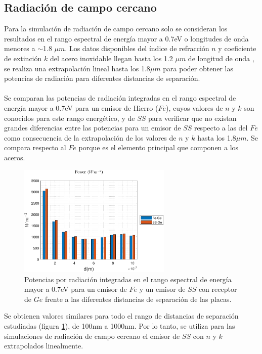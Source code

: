 \subsection{Radiación de campo cercano}
Para la simulación de radiación de campo cercano solo se consideran los resultados en el rango espectral de energía mayor a 0.7eV o longitudes de onda menores a $\sim$1.8 $\mu m$. Los datos disponibles del índice de refracción $n$ y coeficiente de extinción $k$ del acero inoxidable llegan hasta los 1.2 $\mu m$ de longitud de onda \cite{ss_optical_2017}, se realiza una extrapolación lineal hasta los 1.8$\mu m$ para poder obtener las potencias de radiación para diferentes distancias de separación.\\\\
Se comparan las potencias de radiación integradas en el rango espectral de energía mayor a 0.7eV para un emisor de Hierro ($Fe$), cuyos valores de $n$ y $k$ son conocidos para este rango energético, y de $SS$ para verificar que no existan grandes diferencias entre las potencias para un emisor de $SS$ respecto a las del $Fe$ como consecuencia de la extrapolación de los valores de $n$ y $k$ hasta los 1.8$\mu m$. Se compara respecto al $Fe$ porque es el elemento principal que componen a los aceros.
\begin{figure}[H]
	\centering
		\includegraphics[width=0.65\textwidth]{figuras/rad_mat/FevsSs.pdf}
	\caption{Potencias por radiación integradas en el rango espectral de energía mayor a 0.7eV para un emisor de $Fe$ y un emisor de $SS$ con receptor de $Ge$ frente a las diferentes distancias de separación de las placas.}
	\label{fig:FevsSs}
\end{figure}
Se obtienen valores similares para todo el rango de distancias de separación estudiadas (figura \ref{fig:FevsSs}), de 100nm a 1000nm. Por lo tanto, se utiliza para las simulaciones de radiación de campo cercano el emisor de $SS$ con $n$ y $k$ extrapolados linealmente.\\\\
